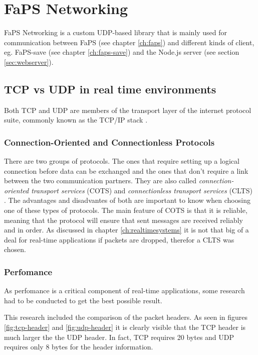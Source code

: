 \chapter{FaPS Networking}
\label{ch:faps-networking}

\author{Nico Kratky}
%
FaPS Networking is a custom UDP-based library that is mainly used for communication between FaPS (see chapter \vref{ch:faps}) and different kinds of client, eg. FaPS-save (see chapter \vref{ch:faps-save}) and the Node.js server (see
section \vref{sec:webserver}).

\section{TCP vs UDP in real time environments}

Both TCP and UDP are members of the transport layer of the internet protocol suite, commonly known as the TCP/IP stack \autocite{rfc1122}.

\subsection{Connection-Oriented and Connectionless Protocols}

There are two groups of protocols. The ones that require setting up a logical connection before data can be exchanged and the ones that don't require a link between the two communication partners. They are also called
\textit{connection-oriented transport services} (COTS) and \textit{connectionless transport services} (CLTS) \autocite{connectionbased-vs-connectionless}. The advantages and disadvantes of both are important to know when choosing one of these types of protocols.
The main feature of COTS is that it is reliable, meaning that the protocol will ensure that sent messages are received reliably and in order. As discussed in chapter \vref{ch:realtimesystems} it is not that big of a deal for
real-time applications if packets are dropped, therefor a CLTS was chosen.

\subsection{Perfomance}

As perfomance is a critical component of real-time applications, some research had to be conducted to get the best possible result.

This research included the comparison of the packet headers. As seen in figures \vref{fig:tcp-header} and \vref{fig:udp-header} it is clearly visible that the TCP header is much larger the the UDP header. In fact, TCP requires 20 bytes and UDP requires only 8 bytes for the header information.

